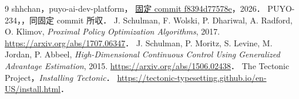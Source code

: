 \begin{thebibliography}{9}
shhchan，puyo-ai-dev-platform，
\href{https://github.com/shhchan/puyo-ai-dev-platform/tree/f8394d77578ecb66e15802fa502d8e1668223006}{固定 commit f8394d77578e}，2026．
PUYO-234，，同固定 commit 所収．
J. Schulman, F. Wolski, P. Dhariwal, A. Radford, O. Klimov,
\emph{Proximal Policy Optimization Algorithms}, 2017.
\url{https://arxiv.org/abs/1707.06347}．
J. Schulman, P. Moritz, S. Levine, M. Jordan, P. Abbeel,
\emph{High-Dimensional Continuous Control Using Generalized Advantage Estimation}, 2015.
\url{https://arxiv.org/abs/1506.02438}．
The Tectonic Project，\emph{Installing Tectonic}．
\url{https://tectonic-typesetting.github.io/en-US/install.html}．
\end{thebibliography}
